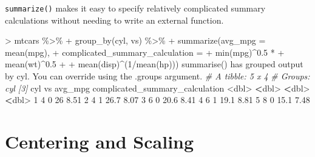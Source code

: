 \documentclass[
]{book}
\newenvironment{Shaded}{\begin{snugshade}}{\end{snugshade}}
\newcommand{\AttributeTok}[1]{\textcolor[rgb]{0.77,0.63,0.00}{#1}}
\newcommand{\CommentTok}[1]{\textcolor[rgb]{0.56,0.35,0.01}{\textit{#1}}}
\newcommand{\DecValTok}[1]{\textcolor[rgb]{0.00,0.00,0.81}{#1}}
\newcommand{\ErrorTok}[1]{\textcolor[rgb]{0.64,0.00,0.00}{\textbf{#1}}}
\newcommand{\FloatTok}[1]{\textcolor[rgb]{0.00,0.00,0.81}{#1}}
\newcommand{\FunctionTok}[1]{\textcolor[rgb]{0.00,0.00,0.00}{#1}}
\newcommand{\NormalTok}[1]{#1}
\newcommand{\SpecialCharTok}[1]{\textcolor[rgb]{0.00,0.00,0.00}{#1}}
\newcommand{\StringTok}[1]{\textcolor[rgb]{0.31,0.60,0.02}{#1}}
\begin{document}
\texttt{summarize()} makes it easy to specify relatively complicated summary calculations without needing to write an external function.

\begin{Shaded}
\begin{Highlighting}[]
\SpecialCharTok{\textgreater{}}\NormalTok{ mtcars }\SpecialCharTok{\%\textgreater{}\%} 
\SpecialCharTok{+}   \FunctionTok{group\_by}\NormalTok{(cyl, vs) }\SpecialCharTok{\%\textgreater{}\%} 
\SpecialCharTok{+}   \FunctionTok{summarize}\NormalTok{(}\AttributeTok{avg\_mpg =} \FunctionTok{mean}\NormalTok{(mpg),}
\SpecialCharTok{+}             \AttributeTok{complicated\_summary\_calculation =} 
\SpecialCharTok{+}               \FunctionTok{min}\NormalTok{(mpg)}\SpecialCharTok{\^{}}\FloatTok{0.5} \SpecialCharTok{*} 
\SpecialCharTok{+}               \FunctionTok{mean}\NormalTok{(wt)}\SpecialCharTok{\^{}}\FloatTok{0.5} \SpecialCharTok{+} 
\SpecialCharTok{+}               \FunctionTok{mean}\NormalTok{(disp)}\SpecialCharTok{\^{}}\NormalTok{(}\DecValTok{1}\SpecialCharTok{/}\FunctionTok{mean}\NormalTok{(hp)))}
\StringTok{\textasciigrave{}}\AttributeTok{summarise()}\StringTok{\textasciigrave{}}\NormalTok{ has grouped output by }\StringTok{\textquotesingle{}cyl\textquotesingle{}}\NormalTok{. You can override using the }\StringTok{\textasciigrave{}}\AttributeTok{.groups}\StringTok{\textasciigrave{}}\NormalTok{ argument.}
\CommentTok{\# A tibble: 5 x 4}
\CommentTok{\# Groups:   cyl [3]}
\NormalTok{    cyl    vs avg\_mpg complicated\_summary\_calculation}
  \SpecialCharTok{\textless{}}\NormalTok{dbl}\SpecialCharTok{\textgreater{}} \ErrorTok{\textless{}}\NormalTok{dbl}\SpecialCharTok{\textgreater{}}   \ErrorTok{\textless{}}\NormalTok{dbl}\SpecialCharTok{\textgreater{}}                           \ErrorTok{\textless{}}\NormalTok{dbl}\SpecialCharTok{\textgreater{}}
\DecValTok{1}     \DecValTok{4}     \DecValTok{0}    \DecValTok{26}                              \FloatTok{8.51}
\DecValTok{2}     \DecValTok{4}     \DecValTok{1}    \FloatTok{26.7}                            \FloatTok{8.07}
\DecValTok{3}     \DecValTok{6}     \DecValTok{0}    \FloatTok{20.6}                            \FloatTok{8.41}
\DecValTok{4}     \DecValTok{6}     \DecValTok{1}    \FloatTok{19.1}                            \FloatTok{8.81}
\DecValTok{5}     \DecValTok{8}     \DecValTok{0}    \FloatTok{15.1}                            \FloatTok{7.48}
\end{Highlighting}
\end{Shaded}

\hypertarget{centering-and-scaling}{%
\section{Centering and Scaling}\label{centering-and-scaling}}
\end{document}
